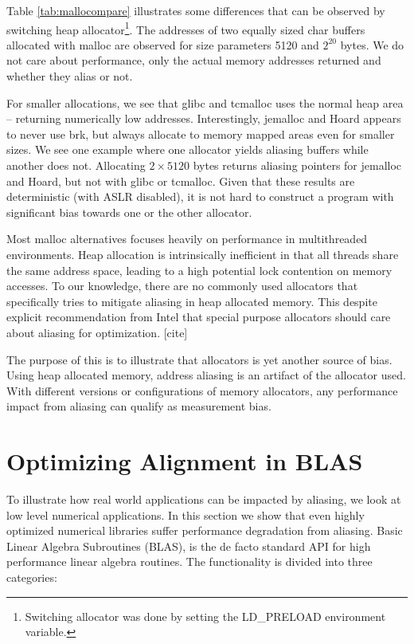\documentclass[a4paper,10pt,twocolumn,twoside]{article}
\begin{document}
{Table \ref{tab:mallocompare} illustrates some differences that can be observed by switching heap allocator\footnote{Switching allocator was done by setting the LD\_PRELOAD environment variable.}.
The addresses of two equally sized char buffers allocated with malloc are observed for size parameters 5120 and $2^{20}$ bytes. 
We do not care about performance, only the actual memory addresses returned and whether they alias or not.

For smaller allocations, we see that glibc and tcmalloc uses the normal heap area -- returning numerically low addresses.
Interestingly, jemalloc and Hoard appears to never use brk, but always allocate to memory mapped areas even for smaller sizes.
We see one example where one allocator yields aliasing buffers while another does not. 
Allocating $2 \times 5120$ bytes returns aliasing pointers for jemalloc and Hoard, but not with glibc or tcmalloc.
Given that these results are deterministic (with ASLR disabled), it is not hard to construct a program with significant bias towards one or the other allocator.

Most malloc alternatives focuses heavily on performance in multithreaded environments.
Heap allocation is intrinsically inefficient in that all threads share the same address space, leading to a high potential lock contention on memory accesses.
To our knowledge, there are no commonly used allocators that specifically tries to mitigate aliasing in heap allocated memory.
This despite explicit recommendation from Intel that special purpose allocators should care about aliasing for optimization. [cite]

The purpose of this is to illustrate that allocators is yet another source of bias.
Using heap allocated memory, address aliasing is an artifact of the allocator used.
With different versions or configurations of memory allocators, any performance impact from aliasing can qualify as measurement bias.


\iffalse

\section{Optimizing Alignment in BLAS}

To illustrate how real world applications can be impacted by aliasing, we look at low level numerical applications.
In this section we show that even highly optimized numerical libraries suffer performance degradation from aliasing.
Basic Linear Algebra Subroutines (BLAS), is the de facto standard API for high performance linear algebra routines.
The functionality is divided into three categories: 

}
\end{document}
